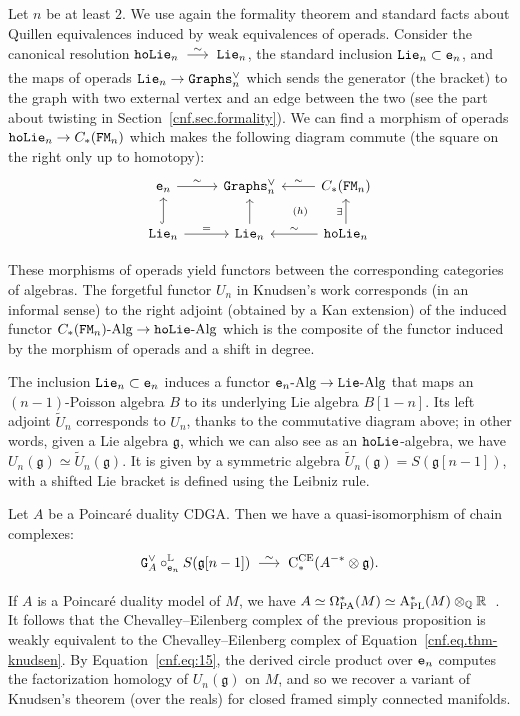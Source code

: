 Let $n$ be at least $2$.
We use again the formality theorem and standard facts about Quillen equivalences induced by weak equivalences of operads.
Consider the canonical resolution $\hoLie_{n} \qiso \Lie_{n}$, the standard inclusion $\mathtt{Lie}_{n} \subset \mathtt{e}_{n}$, and the maps of operads $\mathtt{Lie}_{n} \to \mathtt{Graphs}_{n}^{\vee}$ which sends the generator (the bracket) to the graph with two external vertex and an edge between the two (see the part about twisting in Section~\ref{cnf.sec.formality}).
We can find a morphism of operads $\mathtt{hoLie}_{n} \to C_{*}(\mathtt{FM}_{n})$ which makes the following diagram commute (the square on the right only up to homotopy):
\[
  \begin{tikzcd}
    \en \ar[r, "\sim"] & \Graphs_{n}^{\vee} & C_{*}(\FM_{n}) \ar[l, "\sim" swap] \\
    \Lie_{n} \ar[u, hook] \ar[r, "="] & \Lie_{n} \ar[u] & \hoLie_{n} \ar[l, "\sim" swap] \ar[u, "\exists"] \ar[ul, phantom, "\scriptstyle (h)"]
  \end{tikzcd}
\]

These morphisms of operads yield functors between the corresponding categories of algebras.
The forgetful functor $U_{n}$ in Knudsen's work corresponds (in an informal sense) to the right adjoint (obtained by a Kan extension) of the induced functor $C_{*}(\mathtt{FM}_{n})\text{-Alg} \to \mathtt{hoLie}\text{-Alg}$ which is the composite of the functor induced by the morphism of operads and a shift in degree.

The inclusion $\mathtt{Lie}_{n} \subset \mathtt{e}_{n}$ induces a functor $\mathtt{e}_{n}\text{-Alg} \to \mathtt{Lie}\text{-Alg}$ that maps an $(n-1)$-Poisson algebra $B$ to its underlying Lie algebra $B[1-n]$.
Its left adjoint $\tilde{U}_{n}$ corresponds to $U_{n}$, thanks to the commutative diagram above; in other words, given a Lie algebra $\mathfrak{g}$, which we can also see as an $\mathtt{hoLie}$-algebra, we have $U_{n}(\mathfrak{g}) \simeq \tilde{U}_{n}(\mathfrak{g})$.
It is given by a symmetric algebra $\tilde{U}_{n}(\mathfrak{g}) = S(\mathfrak{g}[n-1])$, with a shifted Lie bracket is defined using the Leibniz rule.

\begin{proposition}
  \label{cnf.prop.cmp-knudsen}
  Let $A$ be a Poincaré duality CDGA.
  Then we have a quasi-iso\-mor\-phism of chain complexes:
  \[ \GG{A}^{\vee} \circ^{\mathbb{L}}_{\en} S(\mathfrak{g}[n-1]) \qiso \CCE(A^{-*} \otimes \mathfrak{g}). \]
\end{proposition}

If $A$ is a Poincaré duality model of $M$, we have $A \simeq \Omega_{\mathrm{PA}}^{*}(M) \simeq \mathrm{A}^{*}_{\mathrm{PL}}(M) \otimes_{\mathbb{Q}} \mathbb{R}$~\cite[Theorem 6.1]{HardtLambrechtsTurchinVolic2011}.
It follows that the Chevalley--Eilenberg complex of the previous proposition is weakly equivalent to the Chevalley--Eilenberg complex of Equation~\eqref{cnf.eq.thm-knudsen}.
By Equation~\eqref{cnf.eq:15}, the derived circle product over $\mathtt{e}_{n}$ computes the factorization homology of $U_{n}(\mathfrak{g})$ on $M$, and so we recover a variant of Knudsen's theorem (over the reals) for closed framed simply connected manifolds.


